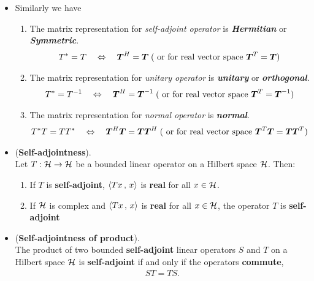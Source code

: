 \documentclass[11pt]{article}
\begin{document}
\begin{itemize}
\item \begin{remark}
Similarly we have
\begin{enumerate}
\item The matrix representation for \emph{self-adjoint operator} is \emph{\textbf{Hermitian}} or \emph{\textbf{Symmetric}}. 
\begin{align*}
T^{*} = T \quad \Leftrightarrow \quad \boldsymbol{T}^{H} =\boldsymbol{T}\; (\text{ or for real vector space } \boldsymbol{T}^{T} =\boldsymbol{T})
\end{align*}
\item The matrix representation for \emph{unitary operator} is \emph{\textbf{unitary}} or \emph{\textbf{orthogonal}}. 
\begin{align*}
T^{*} = T^{-1} \quad \Leftrightarrow \quad \boldsymbol{T}^{H} =\boldsymbol{T}^{-1}\; (\text{ or for real vector space } \boldsymbol{T}^{T} =\boldsymbol{T}^{-1})
\end{align*}
\item The matrix representation for \emph{normal operator} is \emph{\textbf{normal}}. 
\begin{align*}
T^{*}T = TT^{*} \quad \Leftrightarrow \quad \boldsymbol{T}^{H}\boldsymbol{T} =\boldsymbol{T} \boldsymbol{T}^{H}\; (\text{ or for real vector space } \boldsymbol{T}^{T}\boldsymbol{T} =\boldsymbol{T} \boldsymbol{T}^{T})
\end{align*}
\end{enumerate}
\end{remark}

\item \begin{proposition} (\textbf{Self-adjointness}).  \citep{kreyszig1989introductory} \\
 Let $T: {\mathcal H} \rightarrow {\mathcal H}$ be a bounded linear operator on a Hilbert space ${\mathcal H}$. Then:
 \begin{enumerate}
 \item If $T$ is \textbf{self-adjoint}, $\left\langle Tx\,,\, x \right\rangle$ is \textbf{real} for all $x \in {\mathcal H}$.
 \item If ${\mathcal H}$ is complex and $\left\langle Tx\,,\, x \right\rangle$ is \textbf{real} for all $x \in {\mathcal H}$, the operator $T$ is\textbf{ self-adjoint}
 \end{enumerate}
\end{proposition}

\item \begin{proposition}(\textbf{Self-adjointness of product}).  \citep{kreyszig1989introductory} \\
The product of two bounded \textbf{self-adjoint} linear operators $S$ and $T$ on a Hilbert space ${\mathcal H}$ is \textbf{self-adjoint} if and only if the operators \textbf{commute},
\begin{align*}
ST=TS.
\end{align*}
\end{proposition}


\end{itemize}
\end{document}
